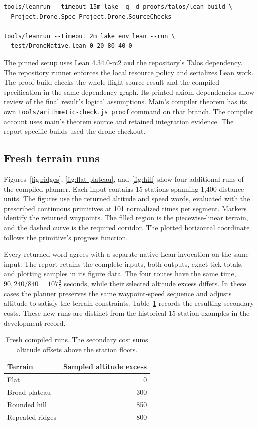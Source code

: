 \documentclass[11pt]{article}
\begin{document}
\begin{lstlisting}
tools/leanrun --timeout 15m lake -q -d proofs/talos/lean build \
  Project.Drone.Spec Project.Drone.SourceChecks

tools/leanrun --timeout 2m lake env lean --run \
  test/DroneNative.lean 0 20 80 40 0
\end{lstlisting}

The pinned setup uses Lean 4.34.0-rc2 and the repository's Talos dependency.  The repository runner enforces the local resource policy and serializes Lean work.  The proof build checks the whole-flight source result and the compiled specification in the same dependency graph.  Its printed axiom dependencies allow review of the final result's logical assumptions.  Main's compiler theorem has its own \texttt{tools/arithmetic-check.js proof} command on that branch.  The compiler account uses main's theorem source and retained integration evidence.  The report-specific builds used the drone checkout.


\subsection{Fresh terrain runs}

Figures~\ref{fig:ridges}, \ref{fig:flat-plateau}, and~\ref{fig:hill} show four additional runs of the compiled planner.  Each input contains 15 stations spanning 1,400 distance units.  The figures use the returned altitude and speed words, evaluated with the prescribed continuous primitives at 101 normalized times per segment.  Markers identify the returned waypoints.  The filled region is the piecewise-linear terrain, and the dashed curve is the required corridor.  The plotted horizontal coordinate follows the primitive's progress function.

Every returned word agrees with a separate native Lean invocation on the same input.  The report retains the complete inputs, both outputs, exact tick totals, and plotting samples in its figure data.  The four routes have the same time, $90{,}240/840=107\tfrac{3}{7}$ seconds, while their selected altitude excess differs.  In these cases the planner preserves the same waypoint-speed sequence and adjusts altitude to satisfy the terrain constraints.  Table~\ref{tab:runs} records the resulting secondary costs.  These new runs are distinct from the historical 15-station examples in the development record.

\begin{table}[htbp]
\centering
\begin{tabular}{lr}
\toprule
Terrain & Sampled altitude excess\\
\midrule
Flat & 0\\
Broad plateau & 300\\
Rounded hill & 850\\
Repeated ridges & 800\\
\bottomrule
\end{tabular}
\caption{Fresh compiled runs.  The secondary cost sums altitude offsets above the station floors.}
\label{tab:runs}
\end{table}
\end{document}
